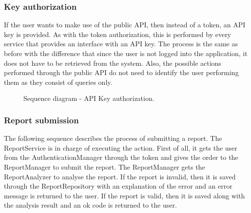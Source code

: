 \subsubsection{Key authorization}
If the user wants to make use of the public API, then instead of a token, an API key is provided. As with the token authorization, this is performed by every service that provides an interface with an API key. The process is the same as before with the difference that since the user is not logged into the application, it does not have to be retrieved from the system. Also, the possible actions performed through the public API do not need to identify the user performing them as they consist of queries only.
\begin{figure}[H]
    \centering
    \caption{\label{fig:sequence-api-key-auth}Sequence diagram - API Key authorization.}
\end{figure}

\subsubsection{Report submission}
The following sequence describes the process of submitting a report.
The ReportService is in charge of executing the action. First of all, it gets the user from the AuthenticationManager through the token and gives the order to the ReportManager to submit the report. The ReportManager gets the ReportAnalyzer to analyse the report. If the report is invalid, then it is saved through the ReportRepository with an explanation of the error and an error message is returned to the user. If the report is valid, then it is saved along with the analysis result and an ok code is returned to the user.

